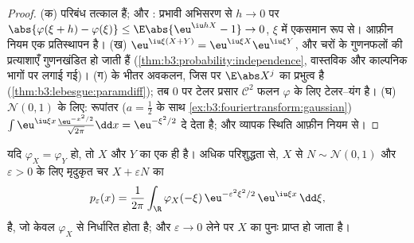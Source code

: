 \begin{proof}
(क) परिबंध तत्काल हैं; और : प्रभावी अभिसरण से $h
\to 0$ पर $\abs{\varphi(\xi + h)
- \varphi(\xi)} \leq \E\abs{\eu^{\iu hX} - 1} \to 0$,
$\xi$ में एकसमान रूप से। आफ़ीन नियम एक प्रतिस्थापन है। (ख) $\eu^{\iu\xi(X+Y)} =
\eu^{\iu\xi X}\eu^{\iu\xi Y}$, और
 चरों के गुणनफलों की प्रत्याशाएँ गुणनखंडित हो जाती हैं
(\cref{thm:b3:probability:independence}, वास्तविक और काल्पनिक भागों पर लगाई गई)। (ग)  के
भीतर अवकलन, जिस पर $\E\abs X^j$ का प्रभुत्व है (\cref{thm:b3:lebesgue:paramdiff}); तब $0$ पर टेलर
प्रसार $\mathcal C^2$ फलन $\varphi$ के लिए टेलर--यंग है। (घ) $\mathcal N(0,1)$ के लिए: 
रूपांतर ($a = \frac12$ के साथ \cref{ex:b3:fouriertransform:gaussian}) $\int\eu^{\iu\xi x}\frac{\eu^{-x^2/2}}{\sqrt{2\pi}}\dd
x = \eu^{-\xi^2/2}$ दे देता है; और व्यापक स्थिति आफ़ीन
नियम से।
\end{proof}

\begin{theorem}[एकैकीपन]\label{thm:b3:clt:injectivity}
यदि $\varphi_X = \varphi_Y$ हो, तो $X$ और $Y$ का  एक ही है। अधिक
परिशुद्धता से, $X$ से  $N \sim \mathcal N(0,1)$ और $\varepsilon > 0$ के लिए मृदुकृत चर
$X +
\varepsilon N$ का 
\[
p_\varepsilon(x) = \frac1{2\pi}\int_\R
\varphi_X(-\xi)\,\eu^{-\varepsilon^2\xi^2/2}\,
\eu^{\iu\xi x}\,\dd\xi ,
\]
है, जो केवल $\varphi_X$ से निर्धारित होता है; और $\varepsilon \to 0$ लेने पर $X$ का
 पुनः प्राप्त हो जाता है।
\end{theorem}

